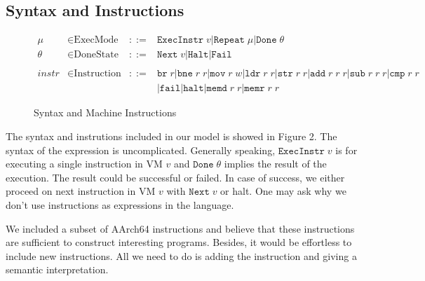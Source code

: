 \documentclass[a4paper]{article}
\newcommand*{\derived}{::=}
\newcommand*{\MODE}{\text{ExecMode}}
\newcommand*{\DONE}{\text{DoneState}}
\newcommand*{\INSTR}{\text{Instruction}}
\newcommand*{\instrm}[1]{\mathtt{#1}}
\newcommand*{\EI}[1]{\mathtt{ExecInstr} \; {#1}}
\newcommand*{\DN}[1]{\mathtt{Done} \; {#1}}
\newcommand*{\NXT}[1]{\mathtt{Next} \; {#1}}
\begin{document}
\subsection{Syntax and Instructions}
\begin{figure}[h!]
  \begin{align*}
    \mu &\in \MODE &\derived & \mathtt{ExecInstr} \; v | \mathtt{Repeat} \; \mu | \mathtt{Done} \; \theta \\
    \theta &\in \DONE &\derived & \NXT{v} | \mathtt{Halt} | \mathtt{Fail}\\
    \\
    instr & \in  \INSTR &\derived & \instrm{br} \; r |\instrm{bne} \; r \; r |
                                    \instrm{mov} \; r \; w | \instrm{ldr} \; r\; r|
                                    \instrm{str} \; r \; r | \instrm{add} \; r \; r \; r |
                                    \instrm{sub} \; r \; r \; r | \instrm{cmp} \; r \; r \\
        & & & | \instrm{fail} | \instrm{halt} | \instrm{memd} \; r \; r | \instrm{memr} \; r\; r
  \end{align*}
  \caption{Syntax and Machine Instructions}
\end{figure}

The syntax and instrutions included in our model is showed in Figure 2. The
syntax of the expression is uncomplicated. Generally speaking, $\EI{v}$ is for
executing a single instruction in VM $v$ and $\DN{\theta}$ implies the result of
the execution. The result could be successful or failed. In case of success, we
either proceed on next instruction in VM $v$ with $\NXT{v}$ or halt. One may ask
why we don't use instructions as expressions in the language.

We included a subset of AArch64 instructions and believe that these instructions
are sufficient to construct interesting programs. Besides, it would be
effortless to include new instructions. All we need to do is adding the
instruction and giving a semantic interpretation.
\end{document}
